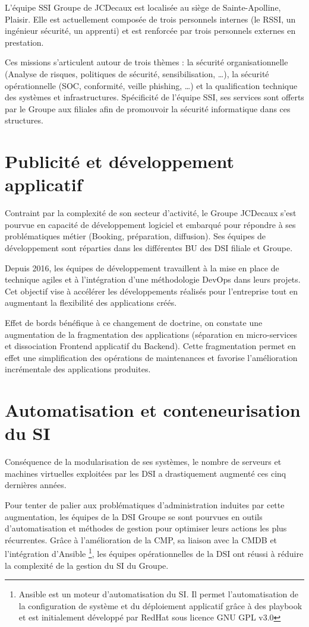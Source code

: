 L'équipe \ac{SSI} Groupe de JCDecaux est localisée au siège de Sainte-Apolline, Plaisir.
\newpage
Elle est actuellement composée de trois personnels internes (le \ac{RSSI}, un ingénieur sécurité, un apprenti) et est 
renforcée par trois personnels externes en prestation.

Ces missions s'articulent autour de trois thèmes : la sécurité organisationnelle (Analyse de risques, 
politiques de sécurité, sensibilisation, \dots), la sécurité opérationnelle (\ac{SOC}, conformité, veille phishing, \dots) et 
la qualification technique des systèmes et infrastructures.
\newline Spécificité de l'équipe \ac{SSI}, ses services sont offerts par le Groupe aux filiales afin de promouvoir la 
sécurité informatique dans ces structures.

\section{Publicité et développement applicatif}
Contraint par la complexité de son secteur d'activité, le Groupe JCDecaux s'est pourvue en capacité de développement
logiciel et embarqué pour répondre à ses problématiques métier (\eg Booking, préparation, diffusion).
Ses équipes de développement sont réparties dans les différentes \ac{BU} des \ac{DSI} filiale et Groupe.

Depuis 2016, les équipes de développement travaillent à la mise en place de technique agiles et à l'intégration d'une 
méthodologie DevOps dans leurs projets. Cet objectif vise à accélérer les développements réalisés 
pour l'entreprise tout en augmentant la flexibilité des applications créés. 

Effet de bords bénéfique à ce changement de doctrine, on constate une augmentation de la fragmentation des applications
(séparation en micro-services et dissociation Frontend applicatif du Backend). Cette fragmentation permet en effet une
simplification des opérations de maintenances et favorise l'amélioration incrémentale des applications produites.

\section{Automatisation et conteneurisation du SI}
Conséquence de la modularisation de ses systèmes, le nombre de serveurs et machines virtuelles exploitées par les 
\ac{DSI} a drastiquement augmenté ces cinq dernières années.

Pour tenter de palier aux problématiques d'administration induites par cette augmentation, les équipes de la \ac{DSI} 
Groupe se sont pourvues en outils d'automatisation et méthodes de gestion pour optimiser leurs actions les plus récurrentes.
Grâce à l'amélioration de la \ac{CMP}, sa liaison avec la \ac{CMDB} et l'intégration d'Ansible \footnote{Ansible est un 
moteur d'automatisation du SI. Il permet l'automatisation de la configuration de système et du déploiement applicatif
grâce à des playbook et est initialement développé par RedHat sous licence GNU GPL v3.0}, les équipes opérationnelles 
de la DSI ont réussi à réduire la complexité de la gestion du \ac{SI} du Groupe.

